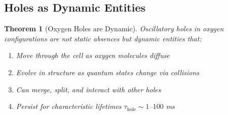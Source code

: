 \documentclass[12pt,a4paper]{article}
\newtheorem{theorem}{Theorem}
\begin{document}
\subsection{Holes as Dynamic Entities}

\begin{theorem}[Oxygen Holes are Dynamic]
\label{thm:oxygen_holes_dynamic}
Oscillatory holes in oxygen configurations are not static absences but dynamic entities that:
\begin{enumerate}
\item Move through the cell as oxygen molecules diffuse
\item Evolve in structure as quantum states change via collisions
\item Can merge, split, and interact with other holes
\item Persist for characteristic lifetimes $\tau_{\text{hole}} \sim 1$--$100$ ms
\end{enumerate}
\end{theorem}
\end{document}
